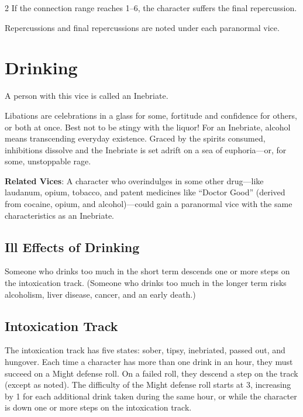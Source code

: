 \begin{multicols}{2}
If the connection range reaches 1–6, the character suffers the final repercussion. 

Repercussions and final repercussions are noted under each paranormal vice.

\section{Drinking}

A person with this vice is called an Inebriate. 

Libations are celebrations in a glass for some, fortitude and confidence for others, or both at once. Best not to be stingy with the liquor! For an Inebriate, alcohol means transcending everyday existence. Graced by the spirits consumed, inhibitions dissolve and the Inebriate is set adrift on a sea of euphoria—or, for some, unstoppable rage. 

\textbf{Related Vices}: A character who overindulges in some other drug—like laudanum, opium, tobacco, and patent medicines like “Doctor Good” (derived from cocaine, opium, and alcohol)—could gain a paranormal vice with the same characteristics as an Inebriate.

\subsection{Ill Effects of Drinking}
 
Someone who drinks too much in the short term descends one or more steps on the intoxication track. (Someone who drinks too much in the longer term risks alcoholism, liver disease, cancer, and an early death.)

\subsection{Intoxication Track}

The intoxication track has five states: sober, tipsy, inebriated, passed out, and hungover. 
Each time a character has more than one drink in an hour, they must succeed on a Might defense roll. On a failed roll, they descend a step on the track (except as noted). The difficulty of the Might defense roll starts at 3, increasing by 1 for each additional drink taken during the same hour, or while the character is down one or more steps on the intoxication track.


\end{multicols}
